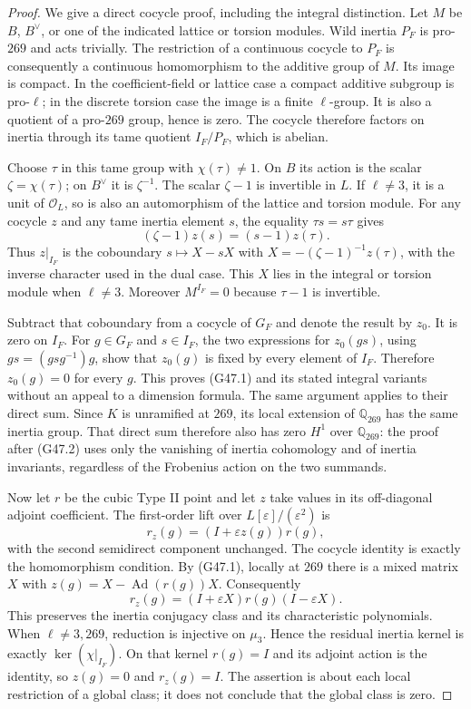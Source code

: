 \begin{proof}
We give a direct cocycle proof, including the integral distinction.
Let $M$ be $B$, $B^\vee$, or one of the indicated lattice or
torsion modules.  Wild inertia $P_F$ is pro-$269$ and acts
trivially.  The restriction of a continuous cocycle to $P_F$
is consequently a continuous homomorphism to the additive
group of $M$.  Its image is compact.  In the coefficient-field
or lattice case a compact additive subgroup is pro-$\ell$;
in the discrete torsion case the image is a finite $\ell$-group.
It is also a quotient of a pro-$269$ group, hence is zero.
The cocycle therefore factors on inertia through its tame
quotient $I_F/P_F$, which is abelian.

Choose $\tau$ in this tame group with $\chi(\tau)\ne1$.
On $B$ its action is the scalar $\zeta=\chi(\tau)$;
on $B^\vee$ it is $\zeta^{-1}$.
The scalar $\zeta-1$ is invertible in $L$.
If $\ell\ne3$, it is a unit of $\mathcal O_L$, so is
also an automorphism of the lattice and torsion module.
For any cocycle $z$ and any tame inertia element $s$,
the equality $\tau s=s\tau$ gives
\[
             (\zeta-1)z(s)=(s-1)z(\tau).             \tag{G47.2}
\]
Thus $z|_{I_F}$ is the coboundary $s\mapsto X-sX$ with
$X=-(\zeta-1)^{-1}z(\tau)$, with the inverse character
used in the dual case.  This $X$ lies in the integral or
torsion module when $\ell\ne3$.  Moreover $M^{I_F}=0$
because $\tau-1$ is invertible.

Subtract that coboundary from a cocycle of $G_F$ and denote
the result by $z_0$.  It is zero on $I_F$.  For $g\in G_F$
and $s\in I_F$, the two expressions for $z_0(gs)$, using
$gs=(gsg^{-1})g$, show that $z_0(g)$ is fixed by every
element of $I_F$.  Therefore $z_0(g)=0$ for every $g$.
This proves (G47.1) and its stated integral variants without
an appeal to a dimension formula.
The same argument applies to their direct sum.  Since $K$ is
unramified at $269$, its local extension of $\mathbb Q_{269}$
has the same inertia group.  That direct sum therefore also
has zero $H^1$ over $\mathbb Q_{269}$: the proof after
(G47.2) uses only the vanishing of inertia cohomology and of
inertia invariants, regardless of the Frobenius action on the
two summands.

Now let $r$ be the cubic Type II point and let $z$ take values
in its off-diagonal adjoint coefficient.  The first-order lift
over $L[\varepsilon]/(\varepsilon^2)$ is
\[
                  r_z(g)=(I+\varepsilon z(g))r(g),    \tag{G47.3}
\]
with the second semidirect component unchanged.
The cocycle identity is exactly the homomorphism condition.
By (G47.1), locally at $269$ there is a mixed matrix $X$ with
$z(g)=X-\operatorname{Ad}(r(g))X$.  Consequently
\[
           r_z(g)=(I+\varepsilon X)r(g)
                              (I-\varepsilon X).     \tag{G47.4}
\]
This preserves the inertia conjugacy class and its characteristic
polynomials.  When $\ell\ne3,269$, reduction is injective on
$\mu_3$.  Hence the residual inertia kernel is exactly
$\ker(\chi|_{I_F})$.  On that kernel $r(g)=I$ and its
adjoint action is the identity, so $z(g)=0$ and $r_z(g)=I$.
The assertion is about each local restriction of a global class;
it does not conclude that the global class is zero.


\end{proof}
